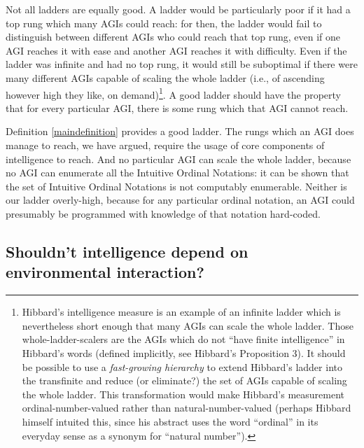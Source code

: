 \documentclass[runningheads]{llncs}
\begin{document}
Not all ladders are equally good. A ladder would be particularly poor if it had
a top rung which many AGIs could reach: for then, the ladder would fail to
distinguish between different AGIs who could reach that top rung, even if one
AGI reaches it with ease and another AGI reaches it with difficulty.
Even if the ladder was infinite and had no top rung, it would still be suboptimal
if there were many different AGIs capable of scaling the whole
ladder (i.e., of ascending however high they like, on demand)\footnote{Hibbard's
intelligence measure
\cite{hibbard2011measuring} is an example of an infinite ladder
which is nevertheless short enough that many AGIs can
scale the whole ladder. Those whole-ladder-scalers are the AGIs which
do not ``have finite intelligence'' in Hibbard's words
(defined implicitly, see Hibbard's Proposition 3). It should be possible to
use a \emph{fast-growing hierarchy}
\cite{hardy1904theorem} \cite{wainer1987provably}
to extend Hibbard's ladder into the transfinite and reduce (or eliminate?)
the set of AGIs capable of scaling the whole ladder. This transformation would make
Hibbard's measurement ordinal-number-valued rather than natural-number-valued
(perhaps Hibbard himself intuited this, since his abstract uses the
word ``ordinal''
in its everyday sense as a synonym for ``natural number'').}.
A good ladder
should have the property that for every particular AGI, there is some rung which
that AGI cannot reach.

Definition \ref{maindefinition} provides a good ladder.
The rungs which an AGI does
manage to reach, we have argued, require the usage of core components of intelligence
to reach.
And no particular AGI can scale
the whole ladder,
because no AGI can enumerate all the Intuitive Ordinal Notations: it can
be shown
that the set of Intuitive Ordinal Notations is not computably enumerable.
Neither is our ladder overly-high, because for any particular
ordinal notation, an AGI could presumably be programmed with knowledge of that notation
hard-coded.

\subsection{Shouldn't intelligence depend on environmental interaction?}
\end{document}
